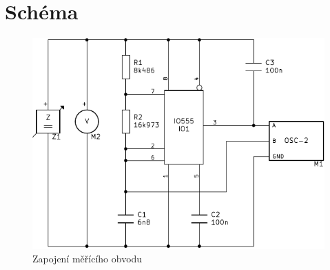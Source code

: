 \section{Schéma}
  \begin{figure}[H]
    \centering
    \includegraphics[width=15cm]{../img/sch2.pdf}
    \caption{Zapojení měřícího obvodu}
    \label{sch:2}
  \end{figure}
